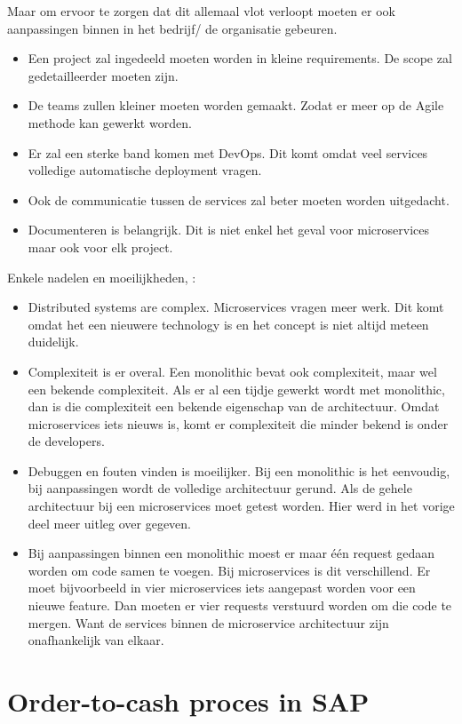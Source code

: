 Maar om ervoor te zorgen dat dit allemaal vlot verloopt moeten er ook aanpassingen binnen in het bedrijf/ de organisatie gebeuren. 
\begin{itemize}
	\item Een project zal ingedeeld moeten worden in kleine requirements. De scope zal gedetailleerder moeten zijn.
	\item De teams zullen kleiner moeten worden gemaakt. Zodat er meer op de Agile methode kan gewerkt worden. 
	\item Er zal een sterke band komen met DevOps. Dit komt omdat veel services volledige automatische deployment vragen.
	\item Ook de communicatie tussen de services zal beter moeten worden uitgedacht.
	\item Documenteren is belangrijk. Dit is niet enkel het geval voor microservices maar ook voor elk project.
\end{itemize}

Enkele nadelen en moeilijkheden, \textcite{Koukia2018}:
\begin{itemize}
	\item Distributed systems are complex. Microservices vragen meer werk. Dit komt omdat het een nieuwere technology is en het concept is niet altijd meteen duidelijk. 
	\item Complexiteit is er overal. Een monolithic bevat ook complexiteit, maar wel een bekende complexiteit. Als er al een tijdje gewerkt wordt met monolithic, dan is die complexiteit een bekende eigenschap van de architectuur. Omdat microservices iets nieuws is, komt er complexiteit die minder bekend is onder de developers.
	\item Debuggen en fouten vinden is moeilijker. Bij een monolithic is het eenvoudig, bij aanpassingen wordt de volledige architectuur gerund. Als de gehele architectuur bij een microservices moet getest worden. Hier werd in het vorige deel meer uitleg over gegeven.
	\item Bij aanpassingen binnen een monolithic moest er maar één request gedaan worden om code samen te voegen. Bij microservices is dit verschillend. Er moet bijvoorbeeld in vier microservices iets aangepast worden voor een nieuwe feature. Dan moeten er vier requests verstuurd worden om die code te mergen. Want de services binnen de microservice architectuur zijn onafhankelijk van elkaar. 
\end{itemize}

\section{Order-to-cash proces in SAP}
